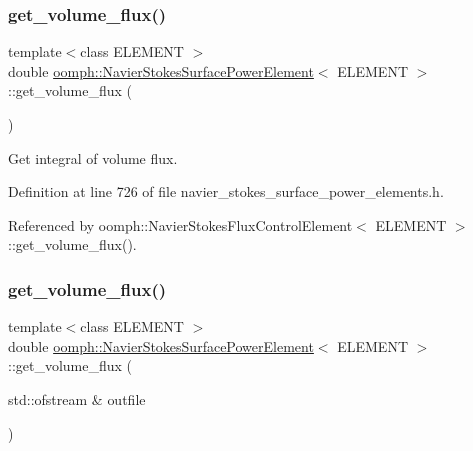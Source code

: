 \subsubsection{\texorpdfstring{get\+\_\+volume\+\_\+flux()}{get\_volume\_flux()}\hspace{0.1cm}{\footnotesize\ttfamily [1/2]}}
{\footnotesize\ttfamily template$<$class E\+L\+E\+M\+E\+NT $>$ \\
double \hyperlink{classoomph_1_1NavierStokesSurfacePowerElement}{oomph\+::\+Navier\+Stokes\+Surface\+Power\+Element}$<$ E\+L\+E\+M\+E\+NT $>$\+::get\+\_\+volume\+\_\+flux (\begin{DoxyParamCaption}{ }\end{DoxyParamCaption})\hspace{0.3cm}{\ttfamily [inline]}}



Get integral of volume flux. 



Definition at line 726 of file navier\+\_\+stokes\+\_\+surface\+\_\+power\+\_\+elements.\+h.



Referenced by oomph\+::\+Navier\+Stokes\+Flux\+Control\+Element$<$ E\+L\+E\+M\+E\+N\+T $>$\+::get\+\_\+volume\+\_\+flux().

\mbox{\label{classoomph_1_1NavierStokesSurfacePowerElement_a9ec3d84951b67c1b84827b2a721c06b8}} 
\subsubsection{\texorpdfstring{get\+\_\+volume\+\_\+flux()}{get\_volume\_flux()}\hspace{0.1cm}{\footnotesize\ttfamily [2/2]}}
{\footnotesize\ttfamily template$<$class E\+L\+E\+M\+E\+NT $>$ \\
double \hyperlink{classoomph_1_1NavierStokesSurfacePowerElement}{oomph\+::\+Navier\+Stokes\+Surface\+Power\+Element}$<$ E\+L\+E\+M\+E\+NT $>$\+::get\+\_\+volume\+\_\+flux (\begin{DoxyParamCaption}\item[{std\+::ofstream \&}]{outfile }\end{DoxyParamCaption})\hspace{0.3cm}{\ttfamily [inline]}}



